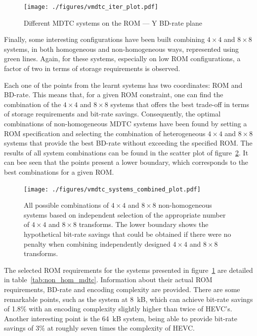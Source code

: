 \documentclass[11pt,a4paper,openright,twoside]{book}
\def\usepdfs{1} %
\numberwithin{equation}{section} %
\numberwithin{figure}{section} %
\numberwithin{table}{section} %
\begin{document}
\begin{figure}[tb]
	\centering
	\ifthenelse{\usepdfs = 0}
	{}
	{\texttt{[image: ./figures/vmdtc\_iter\_plot.pdf]}}
	\caption{Different \acs{MDTC} systems on the \acs{ROM} --- Y \acs{BD}-rate
	plane}
	\label{fig:vmdtc_iter}
\end{figure}

Finally, some interesting configurations have been built combining $4\times4$
and $8\times8$ systems, in both homogeneous and non-homogeneous ways,
represented using green lines.
Again, for these systems, especially on low \acs{ROM} configurations, a factor
of two in terms of storage requirements is observed.

Each one of the points from the learnt systems has two coordinates: \acs{ROM}
and \ac{BD}-rate.
This means that, for a given \acs{ROM} constraint, one can find the
combination of the $4\times4$ and $8\times8$ systems that offers the best
trade-off in terms of storage requirements and bit-rate savings.
Consequently, the optimal combinations of non-homogeneous \ac{MDTC} systems
have been found by setting a \acs{ROM} specification and selecting the
combination of heterogeneous $4\times4$ and $8\times8$ systems that provide
the best \ac{BD}-rate without exceeding the specified \acs{ROM}.
The results of all system combinations can be found in the scatter plot of
figure~\ref{fig:vmdtc_combined}.
It can bee seen that the points present a lower boundary, which corresponds to
the best combinations for a given \acs{ROM}.

\begin{figure}[tb]
	\centering
	\ifthenelse{\usepdfs = 0}
	{}
	{\texttt{[image: ./figures/vmdtc\_systems\_combined\_plot.pdf]}}
	\caption[All possible combinations of $4\times4$ and $8\times8$
	non-homogeneous systems]
	{All possible combinations of $4\times4$ and $8\times8$
	non-homogeneous systems based on independent selection of the appropriate
	number of $4\times4$ and $8\times8$ transforms.
	The lower boundary shows the hypothetical bit-rate savings that could be
	obtained if there were no penalty when combining independently designed
	$4\times4$ and $8\times8$ transforms.}
	\label{fig:vmdtc_combined}
\end{figure}

The selected \acs{ROM} requirements for the systems presented in
figure~\ref{fig:vmdtc_iter} are detailed in
table~\ref{tab:non_hom_mdtc}.
Information about their actual \acs{ROM} requirements, \ac{BD}-rate and
encoding complexity are provided.
There are some remarkable points, such as the system at \SI{8}{\kilo B},
which can achieve bit-rate savings of 1.8\% with an encoding complexity
slightly higher than twice of \ac{HEVC}'s.
Another interesting point is the \SI{64}{\kilo B} system, being able to
provide bit-rate savings of 3\% at roughly seven times the complexity of
\ac{HEVC}.
\end{document}
